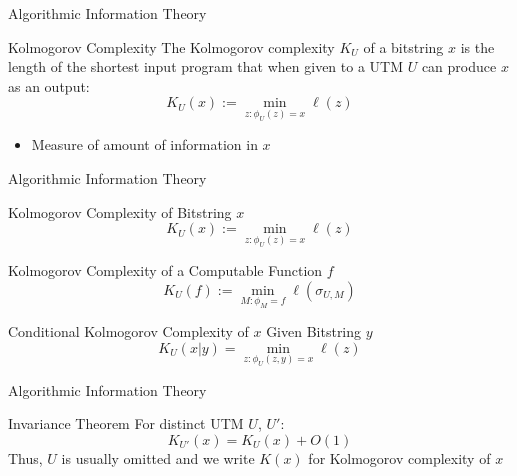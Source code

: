 \begin{frame}{Algorithmic Information Theory}
\begin{block}{Kolmogorov Complexity}
The Kolmogorov complexity $K_U$ of a bitstring $x$ is the length of the shortest input program that when given to a UTM $U$ can produce $x$ as an output:
\begin{equation*}
    K_U(x) :=\min_{z:\phi_U(z) = x}\ell(z)
\end{equation*}
\begin{itemize}
    \item Measure of amount of information in $x$
\end{itemize}
\end{block}
\end{frame}

\begin{frame}{Algorithmic Information Theory}
    \begin{block}{Kolmogorov Complexity of Bitstring $x$}
    \begin{equation*}
        K_U(x) :=\min_{z:\phi_U(z) = x}\ell(z)
    \end{equation*}
    \end{block}
    \begin{block}{Kolmogorov Complexity of a Computable Function $f$}
    \begin{equation*}
        K_U(f) := \min_{M:\phi_M = f} \ell(\sigma_{U,M})
    \end{equation*}
    \end{block}
    \begin{block}{Conditional Kolmogorov Complexity of $x$ Given Bitstring $y$}
\begin{equation*}
    K_U(x|y) = \min_{z:\phi_U(z,y) = x} \ell(z)
\end{equation*}
\end{block}
\end{frame}

\begin{frame}{Algorithmic Information Theory}
    \begin{block}{Invariance Theorem}
    For distinct UTM $U$, $U'$:
        \begin{equation*}
            K_{U'}(x) = K_U(x) + O(1)
        \end{equation*}
        Thus, $U$ is usually omitted and we write $K(x)$ for Kolmogorov complexity of $x$
    \end{block}
\end{frame}

